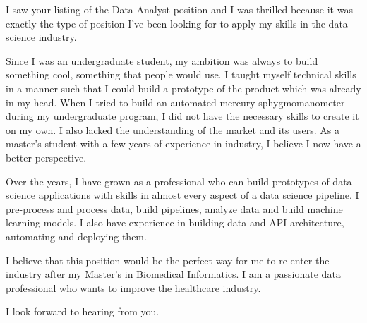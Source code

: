 I saw your listing of the Data Analyst position and I was thrilled because it was exactly the type of position I've been looking for to apply my skills in the data science industry.

Since I was an undergraduate student, my ambition was always to build something cool, something that people would use. I taught myself technical skills in a manner such that I could build a prototype of the product which was already in my head. When I tried to build an automated mercury sphygmomanometer during my undergraduate program, I did not have the necessary skills to create it on my own. I also lacked the understanding of the market and its users. As a master's student with a few years of experience in industry, I believe I now have a better perspective.

Over the years, I have grown as a professional who can build prototypes of data science applications with skills in almost every aspect of a data science pipeline. I pre-process and process data, build pipelines, analyze data and build machine learning models. I also have experience in building data and API architecture, automating and deploying them.

I believe that this position would be the perfect way for me to re-enter the industry after my Master's in Biomedical Informatics. I am a passionate data professional who wants to improve the healthcare industry.

I look forward to hearing from you.